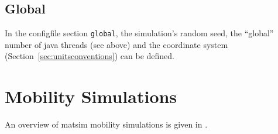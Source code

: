 \subsection{Global}
\label{sec:using-global}
In the \gls{configfile} section \lstinline|global|, the simulation's random seed, the ``global'' number of \gls{java} threads (see above) and the coordinate system (\cf Section~\ref{sec:unitsconventions}) can be defined. 

\section{Mobility Simulations}
\label{sec:using-mobsims}
An overview of \gls{matsim} mobility simulations is given in \citet[][]{Dobler_TechRep_IVT_2011}. %

